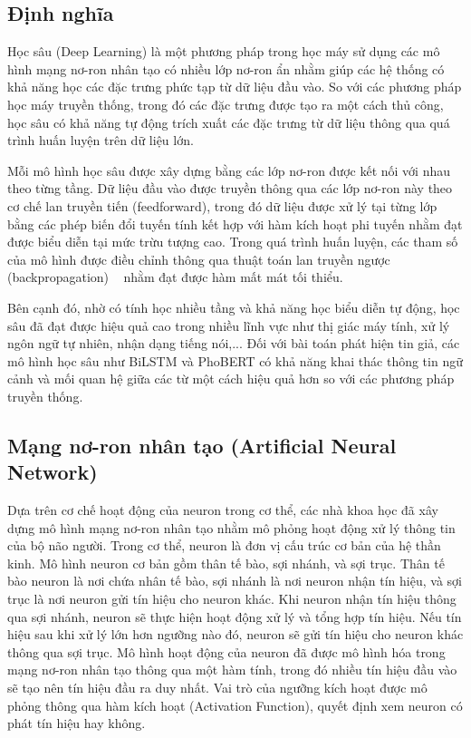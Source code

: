 \documentclass[12pt, a4paper]{report}
\begin{document}
\subsection{Định nghĩa}
Học sâu (Deep Learning) là một phương pháp trong học máy sử dụng các mô hình mạng nơ-ron nhân tạo có nhiều lớp nơ-ron ẩn nhằm giúp các hệ thống có khả năng học các đặc trưng phức tạp từ dữ liệu đầu vào. So với các phương pháp học máy truyền thống, trong đó các đặc trưng được tạo ra một cách thủ công, học sâu có khả năng tự động trích xuất các đặc trưng từ dữ liệu thông qua quá trình huấn luyện trên dữ liệu lớn.

Mỗi mô hình học sâu được xây dựng bằng các lớp nơ-ron được kết nối với nhau theo từng tầng. Dữ liệu đầu vào được truyền thông qua các lớp nơ-ron này theo cơ chế lan truyền tiến (feedforward), trong đó dữ liệu được xử lý tại từng lớp bằng các phép biến đổi tuyến tính kết hợp với hàm kích hoạt phi tuyến nhằm đạt được biểu diễn tại mức trừu tượng cao. Trong quá trình huấn luyện, các tham số của mô hình được điều chỉnh thông qua thuật toán lan truyền ngược (backpropagation) ~\cite{rumelhart1986backprop} nhằm đạt được hàm mất mát tối thiểu.

Bên cạnh đó, nhờ có tính học nhiều tầng và khả năng học biểu diễn tự động, học sâu đã đạt được hiệu quả cao trong nhiều lĩnh vực như thị giác máy tính, xử lý ngôn ngữ tự nhiên, nhận dạng tiếng nói,... Đối với bài toán phát hiện tin giả, các mô hình học sâu như BiLSTM và PhoBERT có khả năng khai thác thông tin ngữ cảnh và mối quan hệ giữa các từ một cách hiệu quả hơn so với các phương pháp truyền thống.

\subsection{Mạng nơ-ron nhân tạo (Artificial Neural Network)}
Dựa trên cơ chế hoạt động của neuron trong cơ thể, các nhà khoa học đã xây dựng mô hình mạng nơ-ron nhân tạo nhằm mô phỏng hoạt động xử lý thông tin của bộ não người. Trong cơ thể, neuron là đơn vị cấu trúc cơ bản của hệ thần kinh. Mô hình neuron cơ bản gồm thân tế bào, sợi nhánh, và sợi trục. Thân tế bào neuron là nơi chứa nhân tế bào, sợi nhánh là nơi neuron nhận tín hiệu, và sợi trục là nơi neuron gửi tín hiệu cho neuron khác. Khi neuron nhận tín hiệu thông qua sợi nhánh, neuron sẽ thực hiện hoạt động xử lý và tổng hợp tín hiệu. Nếu tín hiệu sau khi xử lý lớn hơn ngưỡng nào đó, neuron sẽ gửi tín hiệu cho neuron khác thông qua sợi trục. Mô hình hoạt động của neuron đã được mô hình hóa trong mạng nơ-ron nhân tạo thông qua một hàm tính, trong đó nhiều tín hiệu đầu vào sẽ tạo nên tín hiệu đầu ra duy nhất. Vai trò của ngưỡng kích hoạt được mô phỏng thông qua hàm kích hoạt (Activation Function), quyết định xem neuron có phát tín hiệu hay không.
\end{document}
